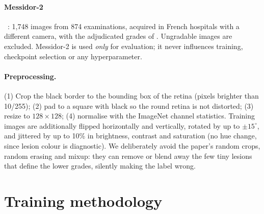 \documentclass[11pt,a4paper]{article}
\begin{document}
\paragraph{Messidor-2}~\cite{decenciere2014messidor,abramoff2013messidor2}:
1,748 images from 874 examinations, acquired in French hospitals with a different
camera, with the adjudicated grades of \citet{krause2018grader}. Ungradable images
are excluded. Messidor-2 is used \emph{only} for evaluation; it never influences
training, checkpoint selection or any hyperparameter.

\paragraph{Preprocessing.} (1) Crop the black border to the bounding box of the
retina (pixels brighter than 10/255); (2) pad to a square with black so the round
retina is not distorted; (3) resize to $128\times128$; (4) normalise with the
ImageNet channel statistics. Training images are additionally flipped horizontally
and vertically, rotated by up to $\pm15^\circ$, and jittered by up to 10\% in
brightness, contrast and saturation (no hue change, since lesion colour is
diagnostic). We deliberately avoid the paper's random crops, random erasing and
mixup: they can remove or blend away the few tiny lesions that define the lower
grades, silently making the label wrong.

\section{Training methodology}
\end{document}
